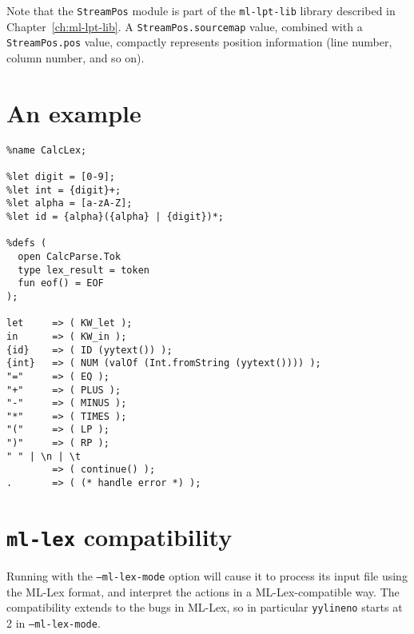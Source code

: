 Note that the {\tt StreamPos} module is part of the {\tt ml-lpt-lib} library described in Chapter~\ref{ch:ml-lpt-lib}.  A {\tt StreamPos.sourcemap} value, combined with a {\tt StreamPos.pos} value, compactly represents position information (line number, column number, and so on).

\section{An example}
\begin{verbatim}
%name CalcLex;

%let digit = [0-9];
%let int = {digit}+;
%let alpha = [a-zA-Z];
%let id = {alpha}({alpha} | {digit})*;

%defs (
  open CalcParse.Tok
  type lex_result = token
  fun eof() = EOF
);

let     => ( KW_let );
in      => ( KW_in );
{id}    => ( ID (yytext()) );
{int}   => ( NUM (valOf (Int.fromString (yytext()))) );
"="     => ( EQ );
"+"     => ( PLUS );
"-"     => ( MINUS );
"*"     => ( TIMES );
"("     => ( LP );
")"     => ( RP );
" " | \n | \t
        => ( continue() );
.       => ( (* handle error *) );
\end{verbatim}

\section{{\tt ml-lex} compatibility}\label{sec:lex-compat}

Running \ulex{} with the {\tt --ml-lex-mode} option will cause it to process its input file using the ML-Lex format, and interpret the actions in a ML-Lex-compatible way.  The compatibility extends to the bugs in ML-Lex, so in particular \texttt{yylineno} starts at 2 in {\tt --ml-lex-mode}.